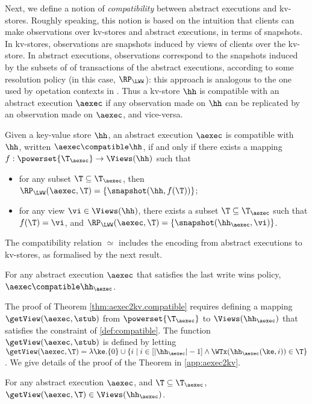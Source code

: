 Next, we define a notion of \emph{compatibility} between abstract executions and 
kv-stores. Roughly speaking, 
this notion is based on the intuition that clients can make observations over kv-stores and abstract 
executions, in terms of snapshots. In kv-stores, 
observations are snapshots induced by views of clients over the kv-store. 
In abstract executions, observations correspond to the snapshots induced by the subsets of
of transactions of the abstract executions, according to some resolution policy (in this 
case, $\RP_{\LWW}$): this approach is analogous to the one used by 
opetation contexts in \cite{repldatatypes}. Thus a kv-store $\hh$ is 
compatible with an abstract execution $\aexec$ if any observation 
made on $\hh$ can be replicated by an observation made on 
$\aexec$, and vice-versa. 

\begin{definition}
\label{def:compatible}
Given a key-value store $\hh$,
an abstract execution $\aexec$ is compatible with $\hh$, written 
$\aexec \compatible \hh$, if and only if there exists a  mapping 
$f: \powerset{\T_{\aexec}} \rightarrow \Views(\hh)$
such that  
\begin{itemize}
\item for any subset $\T \subseteq \T_{\aexec}$, then $\RP_{\LWW}(\aexec, \T) = \{\snapshot(\hh, f(\T))\}$; 
\item for any view $\vi \in \Views(\hh)$, there exists a subset $\T \subseteq \T_{\aexec}$ 
such that $f(\T) = \vi$, and $\RP_{\LWW}(\aexec, \T) = \{\snapshot(\hh_{\aexec}, \vi)\}$.
\end{itemize}
\end{definition}

The compatibility relation $\simeq$ includes the encoding from abstract executions to kv-stores, 
as formalised by the next result.
\begin{theorem}
\label{thm:aexec2kv.compatible}
For any abstract execution $\aexec$ that satisfies the last write wins policy, $\aexec \compatible \hh_{\aexec}$.
\end{theorem}

The proof of Theorem \ref{thm:aexec2kv.compatible} requires defining a mapping 
$\getView(\aexec, \stub)$ from $\powerset{\T_{\aexec}}$ to $\Views(\hh_{\aexec})$ 
that satisfies the constraint of \cref{def:compatible}.
The function $\getView(\aexec, \stub)$ is defined by letting 
$\getView(\aexec, \T) = \lambda \ke. \{0\} \cup \{ i \mid i \in [\lvert \hh_{\aexec} \rvert - 1] \wedge 
\WTx(\hh_{\aexec}(\ke, i)) \in \T\}$.
We give details of the proof of the Theorem in \cref{app:aexec2kv}.
\begin{proposition}
\label{prop:getview.valid}
For any abstract execution $\aexec$, and $\T \subseteq \T_{\aexec}$, 
$\getView(\aexec, \T) \in \Views(\hh_{\aexec})$.
\end{proposition}

